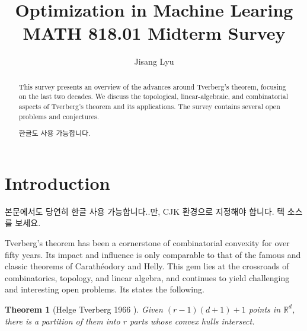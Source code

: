 \documentclass[11pt]{article}
\title{Optimization in Machine Learing\\
	\large MATH 818.01 Midterm Survey
}
\author{Jisang Lyu}
\date{}
\newtheorem{theorem}{Theorem}
\newcommand{\rr}{\mathbb{R}}
\DeclareMathOperator{\conv}{conv}
\begin{document}
	
	\maketitle
	
	\begin{abstract}
		This survey presents an overview of the advances around Tverberg's theorem, focusing on the last two decades.  We discuss the topological, linear-algebraic, and combinatorial aspects of Tverberg's theorem and its applications.  The survey contains several open problems and conjectures.
		\begin{CJK}{UTF8}{mj}
			한글도 사용 가능합니다.
		\end{CJK}
	\end{abstract}
	
	\section{Introduction}\label{section-introduction}
	
	\begin{CJK}{UTF8}{mj}
		본문에서도 당연히 한글 사용 가능합니다..만, CJK 환경으로 지정해야 합니다. 텍 소스를 보세요.
	\end{CJK}
	
	Tverberg's theorem has been a cornerstone of combinatorial convexity for over fifty years. Its impact and influence is only comparable to that of the famous and classic theorems of Carath\'eodory and Helly. This gem lies at the crossroads of combinatorics, topology, and linear algebra, and continues to yield challenging and interesting open problems.  Its states the following.%
	
	\begin{theorem}[Helge Tverberg 1966 \cite{Tverberg:1966tb}]
		Given $(r-1)(d+1)+1$ points in $\rr^d$, there is a partition of them into $r$ parts whose convex hulls intersect.
	\end{theorem}
	
\end{document}
